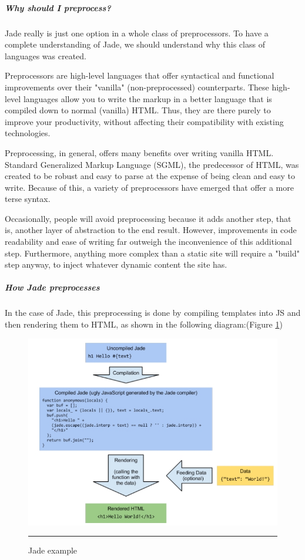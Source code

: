 \subparagraph*{Why should I preprocess?}
\hfill \break
Jade really is just one option in a whole class of preprocessors. To have a complete
understanding of Jade, we should understand why this class of languages was created.


Preprocessors are high-level languages that offer syntactical and functional
improvements over their "vanilla" (non-preprocessed) counterparts. These high-level
languages allow you to write the markup in a better language that is compiled down
to normal (vanilla) HTML. Thus, they are there purely to improve your productivity,
without affecting their compatibility with existing technologies.


Preprocessing, in general, offers many benefits over writing vanilla HTML. Standard
Generalized Markup Language (SGML), the predecessor of HTML, was created to
be robust and easy to parse at the expense of being clean and easy to write. Because
of this, a variety of preprocessors have emerged that offer a more terse syntax.


Occasionally, people will avoid preprocessing because it adds another step, that is,
another layer of abstraction to the end result. However, improvements in code
readability and ease of writing far outweigh the inconvenience of this additional
step. Furthermore, anything more complex than a static site will require a "build"
step anyway, to inject whatever dynamic content the site has.

\subparagraph*{How Jade preprocesses}
\hfill \break
In the case of Jade, this preprocessing is done by compiling templates into JS and
then rendering them to HTML, as shown in the following diagram:(Figure \ref{fig:jade_diagram})
\begin{figure}[h!]
  \centering
    \includegraphics[width=1\textwidth]{./Pictures/jade_diagram.jpg}
  \rule{1\textwidth}{1pt}
 \caption{Jade example}
  \label{fig:jade_diagram}
\end{figure}


